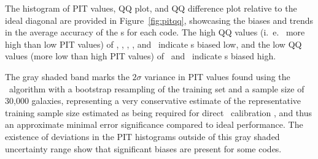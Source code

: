 The histogram of PIT values, QQ plot, and QQ difference plot relative to the ideal diagonal are provided in Figure~\ref{fig:pitqq}, showcasing the biases and trends in the average accuracy of the \pzpdf s for each code.
The high QQ values (i.~e.~ more high than low PIT values) of \bpz, \cmnn, \delight, \eazy, and \gpz\ indicate \pzpdf s biased low, and the low QQ values (more low than high PIT values) of \skynet\ and \tpz\ indicate \pzpdf s biased high.   


The gray shaded band marks the $2\sigma$ variance in PIT values found using the \trainz\ algorithm with a bootstrap resampling of the training set and a sample size of 30,000 galaxies, representing a very conservative estimate of the representative training sample size estimated as being required for direct \pz\ calibration \citep{Newman:2015}, and thus an approximate minimal error significance compared to ideal performance.
The existence of deviations in the PIT histograms outside of this gray shaded uncertainty range show that significant biases are present for some codes.

